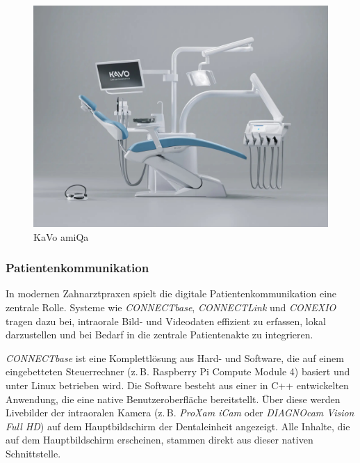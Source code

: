 \begin{figure}[H]
  \centering
  \begin{minipage}[b]{0.55\textwidth}
    \centering
    \includegraphics[width=\textwidth]{images/KaVo-amiQa-TM-frost_9clock-background.jpg}
    
  \end{minipage}
  \hspace{0.05\textwidth}
  \caption{KaVo amiQa}
  \label{fig:Scaler und Spitzen}
\end{figure}
\vspace{1em}
\subsubsection{Patientenkommunikation}

In modernen Zahnarztpraxen spielt die digitale Patientenkommunikation eine zentrale Rolle. Systeme wie \textit{CONNECTbase}, \textit{CONNECTLink} und \textit{CONEXIO} tragen dazu bei, intraorale Bild- und Videodaten effizient zu erfassen, lokal darzustellen und bei Bedarf in die zentrale Patientenakte zu integrieren.

\textit{CONNECTbase} ist eine Komplettlösung aus Hard- und Software, die auf einem eingebetteten Steuerrechner (z.\,B. Raspberry Pi Compute Module 4) basiert und unter Linux betrieben wird. Die Software besteht aus einer in C++ entwickelten Anwendung, die eine native Benutzeroberfläche bereitstellt. Über diese werden Livebilder der intraoralen Kamera (z.\,B. \textit{ProXam iCam} oder \textit{DIAGNOcam Vision Full HD}) auf dem Hauptbildschirm der Dentaleinheit angezeigt. Alle Inhalte, die auf dem Hauptbildschirm erscheinen, stammen direkt aus dieser nativen Schnittstelle.

